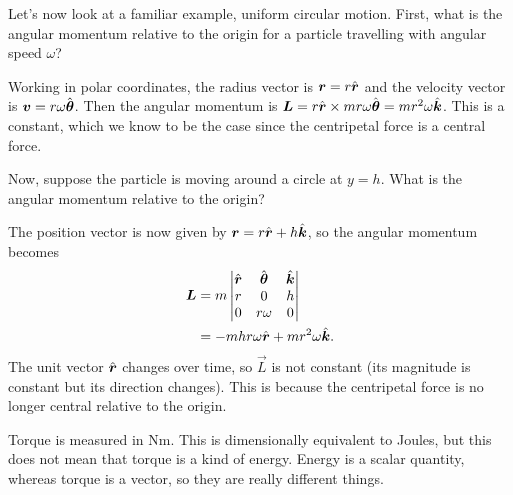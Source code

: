 \documentclass[../classical_mechanics.tex]{subfiles}
\begin{document}
        \begin{example}
            Let's now look at a familiar example, uniform circular motion.
            First, what is the angular momentum relative to the origin for a particle travelling with angular speed $\omega$?

            Working in polar coordinates, the radius vector is $\boldsymbol{r}=r\hat{\boldsymbol{r}}$ and the velocity vector is $\boldsymbol{v}=r\omega\hat{\boldsymbol{\theta}}$.
            Then the angular momentum is $\boldsymbol{L}=r\hat{\boldsymbol{r}}\times mr\omega\hat{\boldsymbol{\theta}}=mr^2\omega\hat{\boldsymbol{k}}$.
            This is a constant, which we know to be the case since the centripetal force is a central force.

            Now, suppose the particle is moving around a circle at $y=h$.
            What is the angular momentum relative to the origin?

            The position vector is now given by $\boldsymbol{r}=r\hat{\boldsymbol{r}}+h\hat{\boldsymbol{k}}$, so the angular momentum becomes
            \begin{align}
                \boldsymbol{L}&=m\begin{vmatrix}
                    \hat{\boldsymbol{r}} & \hat{\boldsymbol{\theta}} & \hat{\boldsymbol{k}} \\
                    r & 0 & h \\
                    0 & r\omega & 0
                \end{vmatrix}\\
                &=-mhr\omega\hat{\boldsymbol{r}}+mr^2\omega\hat{\boldsymbol{k}}.
            \end{align}
            The unit vector $\hat{\boldsymbol{r}}$ changes over time, so $\vec{L}$ is not constant (its magnitude is constant but its direction changes).
            This is because the centripetal force is no longer central relative to the origin.
        \end{example}

        Torque is measured in $\unit{\newton\meter}$.
        This is dimensionally equivalent to Joules, but this does not mean that torque is a kind of energy.
        Energy is a scalar quantity, whereas torque is a vector, so they are really different things.
\end{document}

